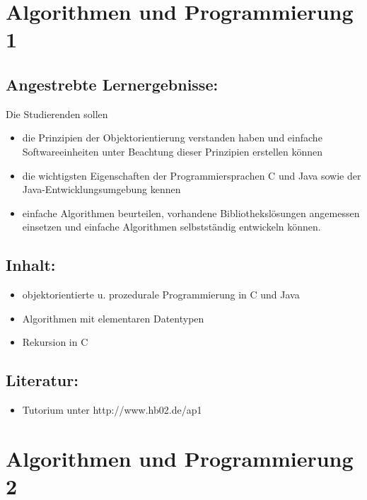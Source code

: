 \chapter{Algorithmen und Programmierung
1}\label{algorithmen-und-programmierung-1}

\section*{Angestrebte
Lernergebnisse:}\label{angestrebte-lernergebnisse}

Die Studierenden sollen

\begin{itemize}
\item
  die Prinzipien der Objektorientierung verstanden haben und einfache
  Softwareeinheiten unter Beachtung dieser Prinzipien erstellen können
\item
  die wichtigsten Eigenschaften der Programmiersprachen C und Java sowie
  der Java-Entwicklungsumgebung kennen
\item
  einfache Algorithmen beurteilen, vorhandene Bibliothekslösungen
  angemessen einsetzen und einfache Algorithmen selbstständig entwickeln
  können.
\end{itemize}

\section*{Inhalt:}\label{inhalt}

\begin{itemize}
\item
  objektorientierte u. prozedurale Programmierung in C und Java
\item
  Algorithmen mit elementaren Datentypen
\item
  Rekursion in C
\end{itemize}

\section*{Literatur:}\label{literatur}

\begin{itemize}
\tightlist
\item
  Tutorium unter http://www.hb02.de/ap1
\end{itemize}

\chapter{Algorithmen und Programmierung
2}\label{algorithmen-und-programmierung-2}

